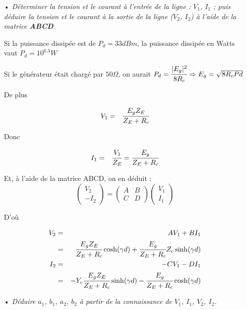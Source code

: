 \documentclass[11pt;a4paper;fleqn]{report}
\begin{document}
\begin{itemize}
    \item[•] \textit{Déterminer la tension et le courant à l'entrée de la ligne : $V_1$, $I_1$ ; puis déduire la tension et le courant à la sortie de la ligne ($V_2$, $I_2$) à l'aide de la matrice \textbf{ABCD}.}
  
     Si la puissance dissipée est de $P_d = 33 dBm$, la puissance dissipée en Watts vaut $P_d = 10^{6.3}W$

     Si le générateur était chargé par $50 \Omega$, on aurait $P_d = \cfrac{|E_g|^2}{8R_c} \Rightarrow E_g = \sqrt{8 R_c Pd}$
     
     De plus 
     
     \begin{eqnarray}
      V_1 &=& \cfrac{E_g Z_E}{Z_E+R_c}
     \end{eqnarray}
     
     Donc 
     
     \begin{eqnarray}
      I_1 &=& \cfrac{V_1}{Z_E} = \cfrac{E_g}{Z_E+R_c}
     \end{eqnarray}
     
     Et, à l'aide de la matrice ABCD, on en déduit : 
     \[
      \begin{pmatrix}
       V_2 \\
       -I_2  
      \end{pmatrix}
      =
      \begin{pmatrix}
       A & B \\
       C & D
      \end{pmatrix}
      \begin{pmatrix}
       V_1 \\
       I_1
      \end{pmatrix}
     \]

     D'où

     \begin{eqnarray}
      V_2 &=& A V_1 + B I_1 \nonumber \\
      &=& \cfrac{E_g Z_E}{Z_E+R_c} \cosh(\gamma d) + \cfrac{E_g}{Z_E+R_c} Z_c \sinh(\gamma d)\\
      I_2 &=& -C V_1 - D I_1 \nonumber \\
      &=& - Y_c \cfrac{E_g Z_E}{Z_E+R_c} \sinh(\gamma d) - \cfrac{E_g}{Z_E+R_c} \cosh(\gamma d)
     \end{eqnarray}
  
    \item[•] \textit{Déduire $a_1$, $b_1$, $a_2$, $b_2$ à partir de la connaissance de $V_1$, $I_1$, $V_2$, $I_2$.}


\end{itemize}
\end{document}
